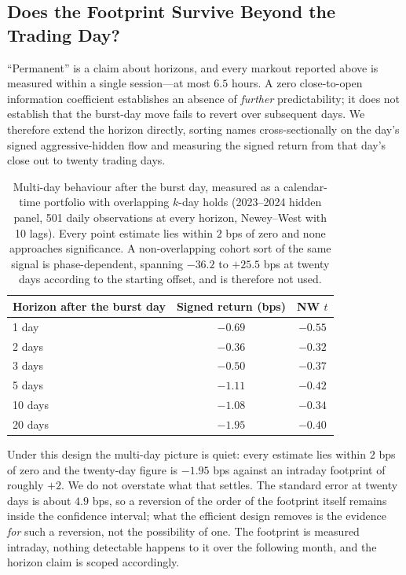 \documentclass[11pt]{article}
\begin{document}
\subsection{Does the Footprint Survive Beyond the Trading Day?}
\label{sub:multiday}

``Permanent'' is a claim about horizons, and every markout reported above is measured
within a single session---at most $6.5$ hours. A zero close-to-open information coefficient
establishes an absence of \emph{further} predictability; it does not establish that the
burst-day move fails to revert over subsequent days. We therefore extend the horizon
directly, sorting names cross-sectionally on the day's signed aggressive-hidden flow and
measuring the signed return from that day's close out to twenty trading days.

\begin{table}[htbp]
\centering
\begin{tabular}{lcc}
\toprule
\textbf{Horizon after the burst day} & \textbf{Signed return (bps)} & \textbf{NW $t$} \\
\midrule
1 day & $-0.69$ & $-0.55$ \\
2 days & $-0.36$ & $-0.32$ \\
3 days & $-0.50$ & $-0.37$ \\
5 days & $-1.11$ & $-0.42$ \\
10 days & $-1.08$ & $-0.34$ \\
20 days & $-1.95$ & $-0.40$ \\
\bottomrule
\end{tabular}
\caption{Multi-day behaviour after the burst day, measured as a calendar-time portfolio with
overlapping $k$-day holds (2023--2024 hidden panel, 501 daily observations at every horizon,
Newey--West with 10 lags). Every point estimate lies within $2$ bps of zero and none
approaches significance. A non-overlapping cohort sort of the same signal is phase-dependent,
spanning $-36.2$ to $+25.5$ bps at twenty days according to the starting offset, and is
therefore not used.}
\label{tab:multiday}
\end{table}

Under this design the multi-day picture is quiet: every estimate lies within $2$ bps of zero
and the twenty-day figure is $-1.95$ bps against an intraday footprint of roughly $+2$. We do
not overstate what that settles. The standard error at twenty days is about $4.9$ bps, so a
reversion of the order of the footprint itself remains inside the confidence interval; what
the efficient design removes is the evidence \emph{for} such a reversion, not the possibility
of one. The footprint is measured intraday, nothing detectable happens to it over the
following month, and the horizon claim is scoped accordingly.
\end{document}
